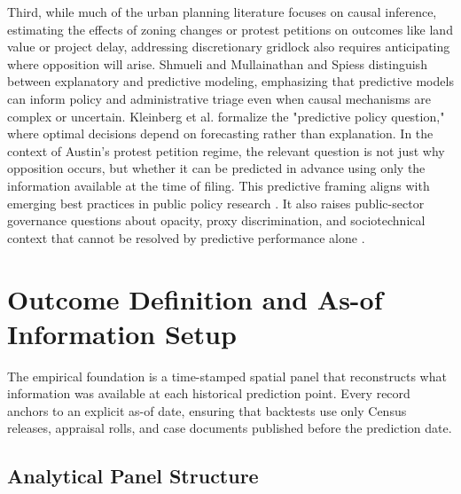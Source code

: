 \documentclass[11pt, letterpaper, oneside]{article}
\begin{document}
Third, while much of the urban planning literature focuses on causal inference, estimating the effects of zoning changes or protest petitions on outcomes like land value or project delay, addressing discretionary gridlock also requires anticipating where opposition will arise. Shmueli \cite{shmueli2010} and Mullainathan and Spiess \cite{mullainathan2017ml} distinguish between explanatory and predictive modeling, emphasizing that predictive models can inform policy and administrative triage even when causal mechanisms are complex or uncertain. Kleinberg et al. \cite{kleinberg2015prediction} formalize the "predictive policy question," where optimal decisions depend on forecasting rather than explanation. In the context of Austin's protest petition regime, the relevant question is not just why opposition occurs, but whether it can be predicted in advance using only the information available at the time of filing. This predictive framing aligns with emerging best practices in public policy research \cite{athey2019ml}. It also raises public-sector governance questions about opacity, proxy discrimination, and sociotechnical context that cannot be resolved by predictive performance alone \cite{eubanks2018,oneil2016weapons,barocas2016,selbst2019fairness}.

\section{Outcome Definition and As-of Information Setup}

The empirical foundation is a time-stamped spatial panel that reconstructs what information was available at each historical prediction point. Every record anchors to an explicit as-of date, ensuring that backtests use only Census releases, appraisal rolls, and case documents published before the prediction date.

\subsection{Analytical Panel Structure}
\end{document}
